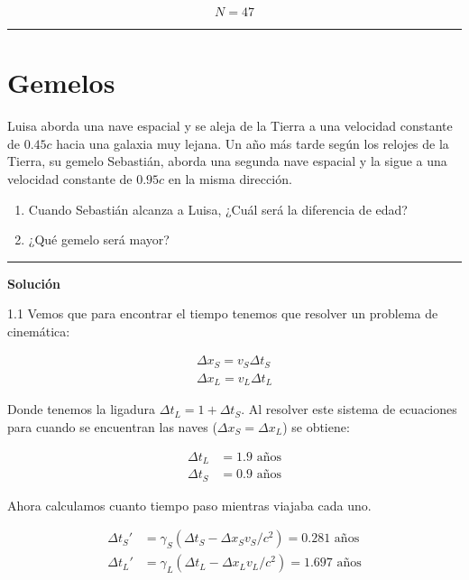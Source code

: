 \documentclass[12pt]{article}
\begin{document}
\begin{equation}
N  = 47
\end{equation}

\noindent\rule{16.5cm}{0.4pt}


\section{Gemelos}

Luisa aborda una nave espacial y se aleja de la Tierra a una velocidad constante de $0.45c$ hacia una galaxia muy lejana. Un a\~no m\'as tarde seg\'un los relojes de la Tierra, su gemelo Sebastián, aborda una segunda nave espacial y la sigue a una velocidad constante de $0.95c$ en la misma dirección. 
\begin{enumerate}
	\item Cuando Sebastián alcanza a Luisa, ¿Cuál será la diferencia de edad?
	\item ¿Qué gemelo será mayor?
\end{enumerate}

\noindent\rule{16.5cm}{0.4pt}

\begin{center}
	\textbf{Solución}	
\end{center}


1.1 Vemos que para encontrar el tiempo tenemos que resolver un problema de cinemática:

\begin{align*}
\Delta x_S = v_S \Delta t_S\\
\Delta x_L = v_L\Delta  t_L
\end{align*}

Donde tenemos la ligadura $\Delta t_L = 1 + \Delta t_S$. Al resolver este sistema de ecuaciones para cuando se encuentran las naves ($\Delta x_S = \Delta x_L$) se obtiene:

\begin{align*}
\Delta t_L &= 1.9 \text{ años}\\
\Delta t_S &=0.9 \text{ años}
\end{align*}

Ahora calculamos cuanto tiempo paso mientras viajaba cada uno.

\begin{align*}
\Delta  t_S'&= \gamma_S\left( \Delta  t_S -  \Delta x_S v_S/c^2\right) = 0.281  \text{ años}\\
 \Delta t_L'&= \gamma_L\left(  \Delta t_L -  \Delta x_L v_L/c^2\right) = 1.697  \text{ años}
\end{align*}
\end{document}

